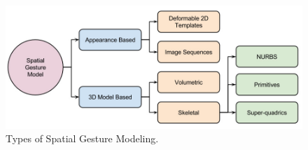 \begin{figure}
	[h] \centering 
	\includegraphics[width=120mm]{figures/content/ges-model.jpg} \caption{Types of Spatial Gesture Modeling. \cite{1}} \label{fg:ges:model} 
\end{figure}
